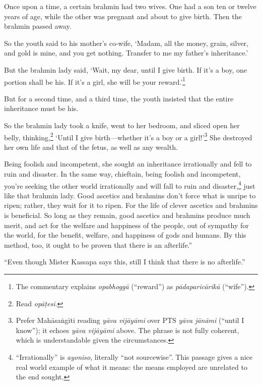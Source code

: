 \documentclass[12pt,openany]{book}%
\begin{document}
Once upon a time, a certain brahmin had two wives. One had a son ten or twelve years of age, while the other was pregnant and about to give birth. Then the brahmin passed away. 

So the youth said to his mother’s co-wife, ‘Madam, all the money, grain, silver, and gold is mine, and you get nothing. Transfer to me my father’s inheritance.’ 

But the brahmin lady said, ‘Wait, my dear, until I give birth. If it’s a boy, one portion shall be his. If it’s a girl, she will be your reward.’\footnote{The commentary explains \textit{\textsanskrit{opabhoggā}} (“reward”) as \textit{\textsanskrit{pādaparicārikā}} (“wife”). } 

But for a second time, and a third time, the youth insisted that the entire inheritance must be his. 

So the brahmin lady took a knife, went to her bedroom, and sliced open her belly, thinking,\footnote{Read \textit{\textsanskrit{opāṭesi}}. } ‘Until I give birth—whether it’s a boy or a girl!’\footnote{Prefer \textsanskrit{Mahāsaṅgīti} reading \textit{\textsanskrit{yāva} \textsanskrit{vijāyāmi}} over PTS \textit{\textsanskrit{yāva} \textsanskrit{jānāmi}} (“until I know”); it echoes \textit{\textsanskrit{yāva} \textsanskrit{vijāyāmi}} above. The phrase is not fully coherent, which is understandable given the circumstances. } She destroyed her own life and that of the fetus, as well as any wealth. 

Being foolish and incompetent, she sought an inheritance irrationally and fell to ruin and disaster. In the same way, chieftain, being foolish and incompetent, you’re seeking the other world irrationally and will fall to ruin and disaster,\footnote{“Irrationally” is \textit{ayoniso}, literally “not sourcewise”. This passage gives a nice real world example of what it means: the means employed are unrelated to the end sought. } just like that brahmin lady. Good ascetics and brahmins don’t force what is unripe to ripen; rather, they wait for it to ripen. For the life of clever ascetics and brahmins is beneficial. So long as they remain, good ascetics and brahmins produce much merit, and act for the welfare and happiness of the people, out of sympathy for the world, for the benefit, welfare, and happiness of gods and humans. By this method, too, it ought to be proven that there is an afterlife.” 

“Even though Mister Kassapa says this, still I think that there is no afterlife.” 
\end{document}
